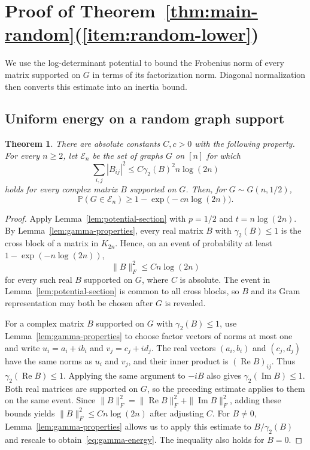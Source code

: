 \documentclass[11pt]{article}
\numberwithin{equation}{section}
\newtheorem{theorem}{Theorem}[section]
\theoremstyle{definition}
\theoremstyle{remark}
\begin{document}
\section{Proof of Theorem~\texorpdfstring{\ref{thm:main-random}(\ref{item:random-lower})}{()}}
\label{sec:random-energy}

We use the log-determinant potential to bound the Frobenius norm of
every matrix supported on $G$ in terms of its factorization norm.
Diagonal normalization then converts this estimate into an inertia bound.

\subsection{Uniform energy on a random graph support}

\begin{theorem}
\label{thm:gamma-energy}
There are absolute constants $C,c>0$ with the following property.
For every $n\geq2$, let $\mathcal E_n$ be the set of graphs $G$
on $[n]$ for which
\begin{equation}\label{eq:gamma-energy}
 \sum_{i,j}|B_{ij}|^2
 \leq C\gamma_2(B)^2 n\log(2n)
\end{equation}
holds for every complex matrix $B$ supported on $G$.
Then, for $G\sim G(n,1/2)$,
\[
 \mathbb P(G\in\mathcal E_n)
 \geq1-\exp\bigl(-cn\log(2n)\bigr).
\]
\end{theorem}
\begin{proof}
Apply Lemma~\ref{lem:potential-section} with $p=1/2$ and
$t=n\log(2n)$. By Lemma~\ref{lem:gamma-properties}, every real matrix
$B$ with $\gamma_2(B)\leq1$ is the cross block of a matrix in $K_{2n}$.
Hence, on an event of probability at least $1-\exp(-n\log(2n))$,
\[
 \|B\|_F^2\leq Cn\log(2n)
\]
for every such real $B$ supported on $G$, where $C$ is absolute.
The event in Lemma~\ref{lem:potential-section} is common to all cross
blocks, so $B$ and its Gram representation may both be chosen after
$G$ is revealed.

For a complex matrix $B$ supported on $G$ with $\gamma_2(B)\leq1$,
use Lemma~\ref{lem:gamma-properties} to choose factor vectors of norms
at most one and write
$u_i=a_i+ib_i$ and $v_j=c_j+id_j$. The real vectors
$(a_i,b_i)$ and $(c_j,d_j)$ have the same norms as $u_i$ and $v_j$,
and their inner product is $(\operatorname{Re}B)_{ij}$. Thus
$\gamma_2(\operatorname{Re}B)\leq1$. Applying the same argument to $-iB$
also gives $\gamma_2(\operatorname{Im}B)\leq1$.
Both real matrices are supported on $G$, so the preceding estimate
applies to them on the same event. Since
$\|B\|_F^2=\|\operatorname{Re}B\|_F^2+\|\operatorname{Im}B\|_F^2$,
adding these bounds yields $\|B\|_F^2\leq Cn\log(2n)$ after adjusting $C$.
For $B\ne0$, Lemma~\ref{lem:gamma-properties} allows us to apply this
estimate to $B/\gamma_2(B)$ and rescale to obtain~\eqref{eq:gamma-energy}.
The inequality also holds for $B=0$.
\end{proof}
\end{document}
